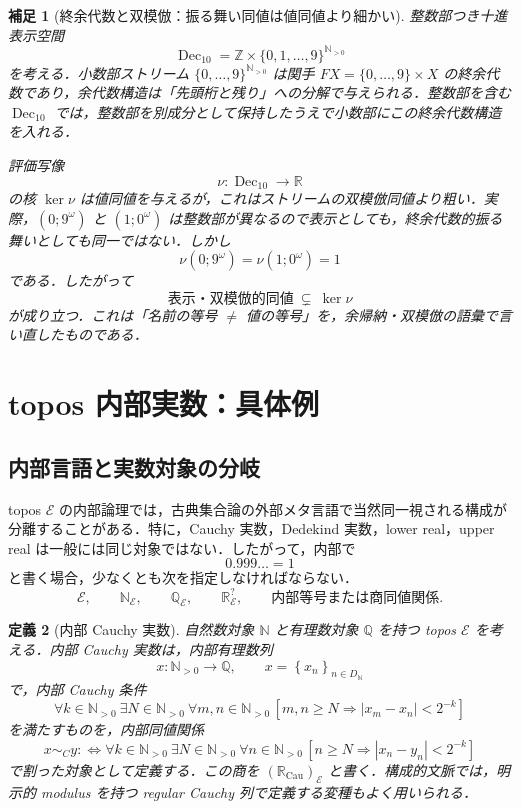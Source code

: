 \documentclass[a4paper,11pt]{ltjsarticle}
\theoremstyle{jpdef}
\newtheorem{definition}{定義}[section]
\newtheorem{remark}[definition]{補足}
\theoremstyle{jpthm}
\newcommand{\N}{\mathbb{N}}
\newcommand{\Z}{\mathbb{Z}}
\newcommand{\R}{\mathbb{R}}
\newcommand{\Dec}{\operatorname{Dec}_{10}}
\newcommand{\Ns}{\N_{>0}}
\newcommand{\DN}{D_{\N}}
\newcommand{\seq}[2]{\left\{#1\right\}_{#2}}
\newcommand{\RealCau}{\mathbb{R}_{\mathrm{Cau}}}
\begin{document}
\begin{remark}[終余代数と双模倣：振る舞い同値は値同値より細かい]
整数部つき十進表示空間
\[
  \Dec=\Z\times\{0,1,\ldots,9\}^{\Ns}
\]
を考える．小数部ストリーム \(\{0,\ldots,9\}^{\Ns}\) は関手 \(FX=\{0,
\ldots,9\}\times X\) の終余代数であり，余代数構造は「先頭桁と残り」への分解で与えられる．整数部を含む \(\Dec\) では，整数部を別成分として保持したうえで小数部にこの終余代数構造を入れる．

評価写像
\[
  \nu:\Dec\to\R
\]
の核 \(\ker\nu\) は値同値を与えるが，これはストリームの双模倣同値より粗い．実際，\((0;9^\omega)\) と \((1;0^\omega)\) は整数部が異なるので表示としても，終余代数的振る舞いとしても同一ではない．しかし
\[
  \nu(0;9^\omega)=\nu(1;0^\omega)=1
\]
である．したがって
\[
  \text{表示・双模倣的同値}\ \subsetneq\ \ker\nu
\]
が成り立つ．これは「名前の等号 \(\ne\) 値の等号」を，余帰納・双模倣の語彙で言い直したものである．
\end{remark}

\section{topos 内部実数：具体例}

\subsection{内部言語と実数対象の分岐}

topos \(\mathcal E\) の内部論理では，古典集合論の外部メタ言語で当然同一視される構成が分離することがある．特に，Cauchy 実数，Dedekind 実数，lower real，upper real は一般には同じ対象ではない．したがって，内部で
\[
  0.999\ldots=1
\]
と書く場合，少なくとも次を指定しなければならない．
\[
  \mathcal E,
  \qquad \mathbb N_{\mathcal E},
  \qquad \mathbb Q_{\mathcal E},
  \qquad \mathbb R_{\mathcal E}^{?},
  \qquad \text{内部等号または商同値関係}.
\]

\begin{definition}[内部 Cauchy 実数]
自然数対象 \(\mathbb N\) と有理数対象 \(\mathbb Q\) を持つ topos \(\mathcal E\) を考える．内部 Cauchy 実数は，内部有理数列
\[
  x: \mathbb N_{>0}\to\mathbb Q,
  \qquad x=\seq{x_n}{n\in\DN}
\]
で，内部 Cauchy 条件
\[
  \forall k\in\mathbb N_{>0}\ \exists N\in\mathbb N_{>0}\
  \forall m,n\in\mathbb N_{>0}\,[m,n\ge N\Rightarrow |x_m-x_n|<2^{-k}]
\]
を満たすものを，内部同値関係
\[
  x\sim_C y
  :\Longleftrightarrow
  \forall k\in\mathbb N_{>0}\ \exists N\in\mathbb N_{>0}\
  \forall n\in\mathbb N_{>0}\,[n\ge N\Rightarrow |x_n-y_n|<2^{-k}]
\]
で割った対象として定義する．この商を \((\RealCau)_{\mathcal E}\) と書く．構成的文脈では，明示的 modulus を持つ regular Cauchy 列で定義する変種もよく用いられる．
\end{definition}
\end{document}

